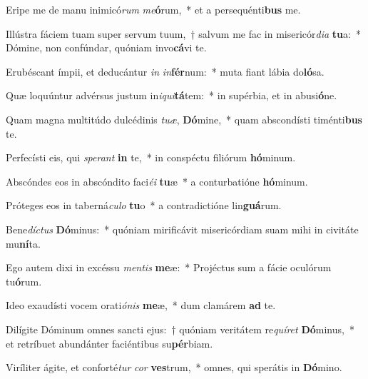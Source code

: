 \item Eripe me de manu inimicó\textit{rum} \textit{me}\textbf{ó}rum,~* et a persequénti\textbf{bus} me.
\item Illústra fáciem tuam super servum tuum,~† salvum me fac in misericór\textit{di}\textit{a} \textbf{tu}a:~* Dómine, non confúndar, quóniam invo\textbf{cá}vi te.
\item Erubéscant ímpii, et deducántur \textit{in} \textit{in}\textbf{fér}num:~* muta fiant lábia do\textbf{ló}sa.
\item Quæ loquúntur advérsus justum in\textit{i}\textit{qui}\textbf{tá}tem:~* in supérbia, et in abusi\textbf{ó}ne.
\item Quam magna multitúdo dulcédinis \textit{tu}\textit{æ}, \textbf{Dó}mine,~* quam abscondísti timénti\textbf{bus} te.
\item Perfecísti eis, qui \textit{spe}\textit{rant} \textbf{in} te,~* in conspéctu filiórum \textbf{hó}minum.
\item Abscóndes eos in abscóndito faci\textit{é}\textit{i} \textbf{tu}æ~* a conturbatióne \textbf{hó}minum.
\item Próteges eos in taberná\textit{cu}\textit{lo} \textbf{tu}o~* a contradictióne lin\textbf{guá}rum.
\item Bene\textit{díc}\textit{tus} \textbf{Dó}minus:~* quóniam mirificávit misericórdiam suam mihi in civitáte mu\textbf{ní}ta.
\item Ego autem dixi in excéssu \textit{men}\textit{tis} \textbf{me}æ:~* Projéctus sum a fácie oculórum tu\textbf{ó}rum.
\item Ideo exaudísti vocem orati\textit{ó}\textit{nis} \textbf{me}æ,~* dum clamárem \textbf{ad} te.
\item Dilígite Dóminum omnes sancti ejus:~† quóniam veritátem re\textit{quí}\textit{ret} \textbf{Dó}minus,~* et retríbuet abundánter faciéntibus su\textbf{pér}biam.
\item Viríliter ágite, et conforté\textit{tur} \textit{cor} \textbf{ves}trum,~* omnes, qui sperátis in \textbf{Dó}mino.
